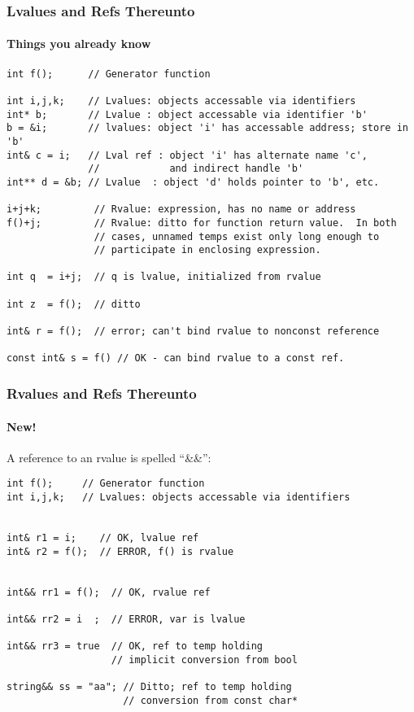 \begin{frame}[fragile]
\frametitle{Lvalues and Refs Thereunto}
\framesubtitle{Things you already know}
{\scriptsize
\begin{verbatim}
int f();      // Generator function

int i,j,k;    // Lvalues: objects accessable via identifiers
int* b;       // Lvalue : object accessable via identifier 'b'
b = &i;       // lvalues: object 'i' has accessable address; store in 'b'
int& c = i;   // Lval ref : object 'i' has alternate name 'c',
              //            and indirect handle 'b'
int** d = &b; // Lvalue  : object 'd' holds pointer to 'b', etc.

i+j+k;         // Rvalue: expression, has no name or address
f()+j;         // Rvalue: ditto for function return value.  In both
               // cases, unnamed temps exist only long enough to 
               // participate in enclosing expression.

int q  = i+j;  // q is lvalue, initialized from rvalue

int z  = f();  // ditto

int& r = f();  // error; can't bind rvalue to nonconst reference

const int& s = f() // OK - can bind rvalue to a const ref.
\end{verbatim}
}
\vskip 12pt
\end{frame}


\begin{frame}[fragile]
\frametitle{Rvalues and Refs Thereunto}
\framesubtitle{New!}

A reference to an rvalue is spelled ``\&\&'':
{\scriptsize
\begin{verbatim}
int f();     // Generator function
int i,j,k;   // Lvalues: objects accessable via identifiers


int& r1 = i;    // OK, lvalue ref
int& r2 = f();  // ERROR, f() is rvalue


int&& rr1 = f();  // OK, rvalue ref

int&& rr2 = i  ;  // ERROR, var is lvalue

int&& rr3 = true  // OK, ref to temp holding
                  // implicit conversion from bool

string&& ss = "aa"; // Ditto; ref to temp holding
                    // conversion from const char*

\end{verbatim}
}

\end{frame}


